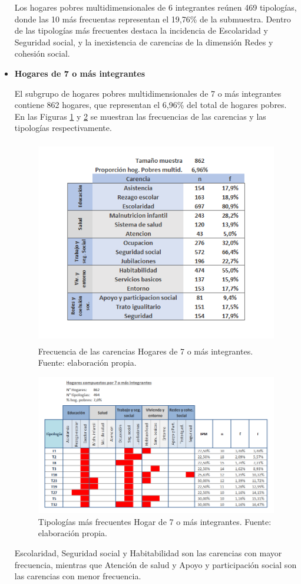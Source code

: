 \documentclass[12pt,letterpaper,spanish]{article}
\begin{document}
\begin{itemize}
    Los hogares pobres multidimensionales de 6 integrantes reúnen 469 tipologías, donde las 10 más frecuentas representan el 19,76\% de la submuestra. Dentro de las tipologías más frecuentes destaca la incidencia de Escolaridad y Seguridad social, y la inexistencia de carencias de la dimensión Redes y cohesión social.

    \item \textbf{Hogares de 7 o más integrantes}
    
    El subgrupo de hogares pobres multidimensionales de 7 o más integrantes contiene 862 hogares, que representan el 6,96\% del total de hogares pobres. En las Figuras \ref{fren7} y \ref{tipn7} se muestran las frecuencias de las carencias y las tipologías respectivamente.
    
    \begin{figure}[H]
        \centering
        \includegraphics[height=9cm]{HOGARES/tabla_num7.png}
        \caption{Frecuencia de las carencias Hogares de 7 o más integrantes. Fuente: elaboración propia.}
        \label{fren7}
    \end{figure}
    \begin{figure}[H]
        \centering
        \includegraphics[width=\textwidth]{Mati N/n=7+.png}
        \caption{Tipologías más frecuentes Hogar de 7 o más integrantes. Fuente: elaboración propia.}
        \label{tipn7}
    \end{figure}
    Escolaridad, Seguridad social y Habitabilidad son las carencias con mayor frecuencia, mientras que Atención de salud y Apoyo y participación social son las carencias con menor frecuencia.
    

\end{itemize}
\end{document}
